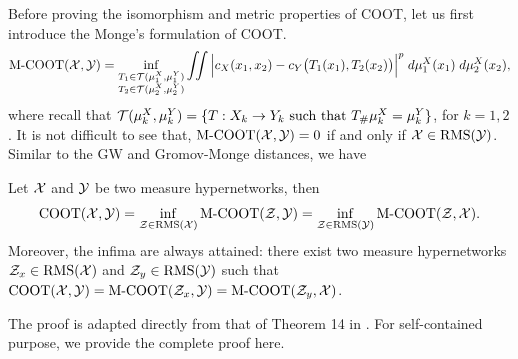 Before proving the isomorphism and metric properties of COOT, let us first introduce the Monge's
formulation of COOT.
\begin{align}
  \text{M-COOT}(\mathcal X, \mathcal Y) =
  \inf_{\substack{T_1 \in \mathcal T(\mu^X_1, \mu^Y_1) \\ T_2 \in \mathcal T(\mu^X_2, \mu^Y_2)}}
  \iint \Big|c_X(x_1, x_2) - c_Y \big( T_1(x_1), T_2(x_2) \big) \Big|^p
  \; d\mu^X_1(x_1) \; d\mu^X_2(x_2),
\end{align}
where recall that
$\mathcal T(\mu^X_k, \mu^Y_k) = \{T: X_k \to Y_k \text{ such that } T_{\#} \mu^X_k = \mu^Y_k \}$,
for $k=1,2$. It is not difficult to see that, $\text{M-COOT}(\mathcal X, \mathcal Y) = 0$ if and only if
$\mathcal X \in \text{RMS}(\mathcal Y)$. Similar to the GW and Gromov-Monge distances, we have
\begin{corollary} \label{coro:coot_mcoot}
  Let $\mathcal X$ and $\mathcal Y$ be two measure hypernetworks, then
  \begin{equation}
    \text{COOT}(\mathcal X, \mathcal Y) = \inf_{\mathcal Z \in \text{RMS}(\mathcal X)} \text{M-COOT}(\mathcal Z, \mathcal Y)
    = \inf_{\mathcal Z \in \text{RMS}(\mathcal Y)} \text{M-COOT}(\mathcal Z, \mathcal X).
  \end{equation}
  Moreover, the infima are always attained: there exist two measure hypernetworks
  $\mathcal Z_x \in \text{RMS}(\mathcal X)$ and $\mathcal Z_y \in \text{RMS}(\mathcal Y)$ such that
  $\text{COOT}(\mathcal X, \mathcal Y) = \text{M-COOT}(\mathcal Z_x, \mathcal Y) = \text{M-COOT}(\mathcal Z_y, \mathcal X)$.
\end{corollary}
The proof is adapted directly from that of Theorem 14 in \citep{Memoli21}.
For self-contained purpose, we provide the complete proof here.
